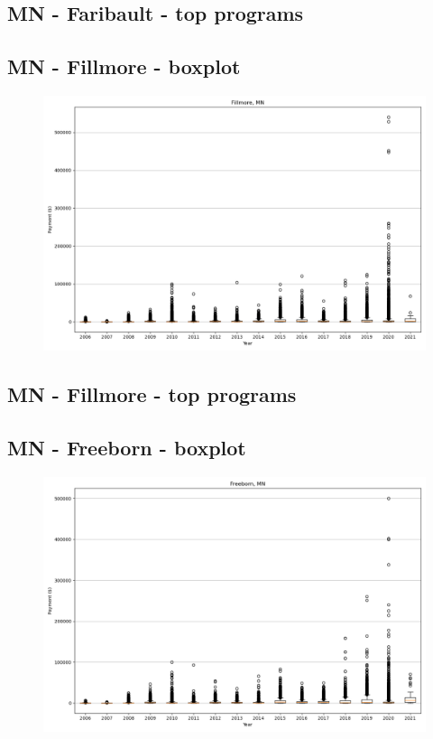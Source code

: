 \subsection*{MN - Faribault - top programs}

\newpage
\subsection*{MN - Fillmore - boxplot}
\begin{figure}[h]
\centering
\includegraphics[width=7in]{../output/boxplots/counties/Fillmore-MN_boxplot.png}
\end{figure}


\subsection*{MN - Fillmore - top programs}

\newpage
\subsection*{MN - Freeborn - boxplot}
\begin{figure}[h]
\centering
\includegraphics[width=7in]{../output/boxplots/counties/Freeborn-MN_boxplot.png}
\end{figure}


